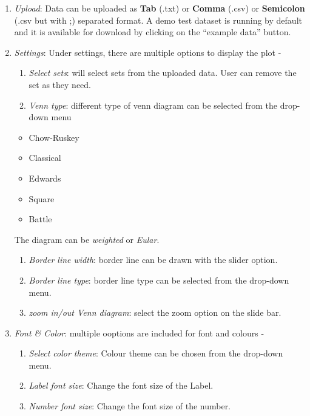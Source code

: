 \documentclass[
  a4paper,
  oneside,
  open=any]{scrreport}
\providecommand{\tightlist}{%
  \setlength{\itemsep}{0pt}\setlength{\parskip}{0pt}}\usepackage{longtable,booktabs,array}
\begin{document}
\begin{enumerate}
\def\labelenumi{\arabic{enumi}.}
\item
  \emph{Upload}: Data can be uploaded as \textbf{Tab} (.txt) or
  \textbf{Comma} (.csv) or \textbf{Semicolon} (.csv but with ;)
  separated format. A demo test dataset is running by default and it is
  available for download by clicking on the ``example data'' button.
\item
  \emph{Settings}: Under settings, there are multiple options to display
  the plot -

  \begin{enumerate}
  \def\labelenumii{\roman{enumii}.}
  \tightlist
  \item
    \emph{Select sets}: will select sets from the uploaded data. User
    can remove the set as they need.
  \item
    \emph{Venn type}: different type of venn diagram can be selected
    from the drop-down menu
  \end{enumerate}

  \begin{itemize}
  \tightlist
  \item
    Chow-Ruskey
  \item
    Classical
  \item
    Edwards
  \item
    Square
  \item
    Battle
  \end{itemize}

  The diagram can be \emph{weighted} or \emph{Eular}.

  \begin{enumerate}
  \def\labelenumii{\roman{enumii}.}
  \setcounter{enumii}{2}
  \item
    \emph{Border line width}: border line can be drawn with the slider
    option.
  \item
    \emph{Border line type}: border line type can be selected from the
    drop-down menu.
  \item
    \emph{zoom in/out Venn diagram}: select the zoom option on the slide
    bar.
  \end{enumerate}
\item
  \emph{Font \& Color}: multiple ooptions are included for font and
  colours -

  \begin{enumerate}
  \def\labelenumii{\roman{enumii}.}
  \item
    \emph{Select color theme}: Colour theme can be chosen from the
    drop-down menu.
  \item
    \emph{Label font size}: Change the font size of the Label.
  \item
    \emph{Number font size}: Change the font size of the number.
  \end{enumerate}
\end{enumerate}
\end{document}

